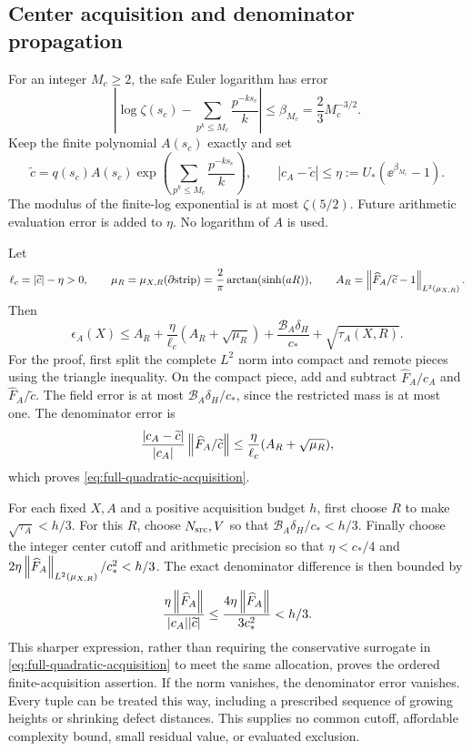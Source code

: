\subsection{Center acquisition and denominator propagation}

For an integer \(M_c\ge2\), the safe Euler logarithm has error
\[
 \left|\log\zeta(s_c)-\sum_{p^k\le M_c}\frac{p^{-ks_c}}k\right|
 \le\beta_{M_c}=\frac23M_c^{-3/2}.
\]
Keep the finite polynomial \(A(s_c)\) exactly and set
\[
 \widetilde c=q(s_c)A(s_c)
       \exp\left(\sum_{p^k\le M_c}\frac{p^{-ks_c}}k\right),\qquad
 |c_A-\widetilde c|\le
 \eta:=U_*(\ee^{\beta_{M_c}}-1).
\]
The modulus of the finite-log exponential is at most \(\zeta(5/2)\).
Future arithmetic evaluation error is added to \(\eta\).
No logarithm of \(A\) is used.

Let
\[
 \ell_c=|\widetilde c|-\eta>0,\qquad
 \mu_R=\mu_{X,R}(\partial{\rm strip})
       =\frac2\pi\arctan(\sinh(aR)),\qquad
 A_R=\left\lVert\widehat F_A/\widetilde c-1\right\rVert_{L^2(\mu_{X,R})}.
\]
Then
\begin{equation}\label{eq:full-quadratic-acquisition}
 \epsilon_A(X)\le A_R+
 \frac{\eta}{\ell_c}(A_R+\sqrt{\mu_R})
 +\frac{\mathcal B_A\delta_H}{c_*}+\sqrt{\tau_A(X,R)}.
\end{equation}
For the proof, first split the complete \(L^2\) norm into compact
and remote pieces using the triangle inequality. On the compact
piece, add and subtract \(\widehat F_A/c_A\) and
\(\widehat F_A/\widetilde c\). The field error is at most
\(\mathcal B_A\delta_H/c_*\), since the restricted mass is at most one.
The denominator error is
\[
 \frac{|c_A-\widetilde c|}{|c_A|}
     \left\lVert\widehat F_A/\widetilde c\right\rVert
 \le\frac{\eta}{\ell_c}(A_R+\sqrt{\mu_R}),
\]
which proves \eqref{eq:full-quadratic-acquisition}.

For each fixed \(X,A\) and a positive acquisition budget \(h\),
first choose \(R\) to make \(\sqrt{\tau_A}<h/3\).
For this \(R\), choose \(N_{\rm src},V\) so that
\(\mathcal B_A\delta_H/c_*<h/3\).
Finally choose the integer center cutoff and arithmetic precision so that
\(\eta<c_*/4\) and
\(2\eta\left\lVert\widehat F_A\right\rVert_{L^2(\mu_{X,R})}/c_*^2<h/3\).
The exact denominator difference is then bounded by
\[
 \frac{\eta\left\lVert\widehat F_A\right\rVert}{|c_A||\widetilde c|}
 \le\frac{4\eta\left\lVert\widehat F_A\right\rVert}{3c_*^2}<h/3.
\]
This sharper expression, rather than requiring the conservative
surrogate in \eqref{eq:full-quadratic-acquisition} to meet the same
allocation, proves the ordered finite-acquisition assertion.
If the norm vanishes, the denominator error vanishes.
Every tuple can be treated this way, including a prescribed sequence
of growing heights or shrinking defect distances. This supplies no
common cutoff, affordable complexity bound, small residual value,
or evaluated exclusion.

